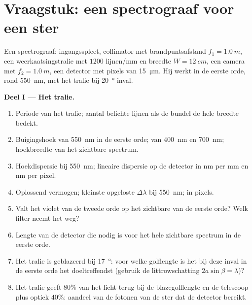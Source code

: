\section{Vraagstuk: een spectrograaf voor een ster}

\begin{problem}
\label{pb:b2:gratings:1}

Een spectrograaf: ingangsspleet, collimator met brandpuntsafstand
$f_1 =
\qty{1.0}{m}$, een weerkaatsingstralie met $1200$ lijnen/mm en
breedte $W =
\qty{12}{cm}$, een camera met $f_2 = \qty{1.0}{m}$, een
detector met pixels van \qty{15}{\micro m}.
Hij werkt in de eerste orde, rond \qty{550}{nm}, met het
tralie bij \qty{20}{\degree} inval.

\medskip
\noindent\textbf{Deel I --- Het tralie.}
\begin{enumerate}
  \item Periode van het tralie; aantal belichte lijnen als de bundel
        de hele breedte bedekt.
  \item Buigingshoek van \qty{550}{nm} in de eerste orde; van
        \qty{400}{nm} en \qty{700}{nm}; hoekbreedte van het zichtbare
        spectrum.
  \item Hoekdispersie bij \qty{550}{nm}; lineaire dispersie op de
        detector in nm per mm en nm per pixel.
  \item Oplossend vermogen; kleinste opgeloste $\Delta\lambda$ bij \qty{550}{nm}; in
        pixels.
  \item Valt het violet van de tweede orde op het zichtbare van de eerste
        orde? Welk filter neemt het weg?
  \item Lengte van de detector die nodig is voor het hele zichtbare spectrum in
        de eerste orde.
  \item Het tralie is geblazeerd bij \qty{17}{\degree}: voor welke golflengte is
        het bij deze inval in de eerste orde het doeltreffendst (gebruik
        de littrowschatting $2a\sin\beta = \lambda$)?
  \item Het tralie geeft $80\%$ van het licht terug bij de blazegolflengte
        en de telescoop plus optiek $40\%$: aandeel van de fotonen van de ster
        dat de detector bereikt.
\end{enumerate}


\end{problem}
